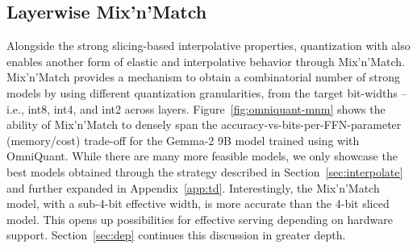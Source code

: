 

\subsection{Layerwise Mix'n'Match}
\label{sec:exp-mnm}
Alongside the strong slicing-based interpolative properties, quantization with \alg also enables another form of elastic and interpolative behavior through Mix'n'Match. Mix'n'Match provides a mechanism to obtain a combinatorial number of strong models by using different quantization granularities, from the target bit-widths -- i.e., int8, int4, and int2 across layers. Figure~\ref{fig:omniquant-mnm} shows the ability of Mix'n'Match to densely span the accuracy-vs-bits-per-FFN-parameter (memory/cost) trade-off for the Gemma-2 9B model trained using \alg with OmniQuant. While there are many more feasible models, we only showcase the best models obtained through the strategy described in Section~\ref{sec:interpolate} and further expanded in Appendix~\ref{app:td}. Interestingly, the Mix'n'Match model, with a sub-4-bit effective width, is more accurate than the 4-bit sliced model. This opens up possibilities for effective serving depending on hardware support. Section~\ref{sec:dep} continues this discussion in greater depth.









